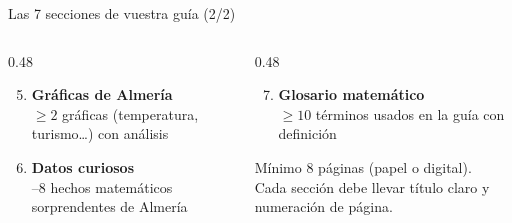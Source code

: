 \documentclass[aspectratio=169, 10pt, spanish]{beamer}
\begin{document}
\begin{frame}{Las 7 secciones de vuestra guía (2/2)}
  \begin{columns}[T]
    \begin{column}{0.48\textwidth}
      \begin{enumerate}
        \setcounter{enumi}{4}
        \item[\faChartLine] \textbf{Gráficas de Almería}\\
          {\AlmFontFootnote $\geq 2$ gráficas (temperatura, turismo\ldots) con análisis}
        \vspace{4pt}
        \item[\faLightbulb] \textbf{Datos curiosos}\\
          {--8 hechos matemáticos sorprendentes de Almería}
      \end{enumerate}
    \end{column}
    \begin{column}{0.48\textwidth}
      \begin{enumerate}
        \setcounter{enumi}{6}
        \item[\faBook] \textbf{Glosario matemático}\\
          {\AlmFontFootnote $\geq 10$ términos usados en la guía con definición}
      \end{enumerate}
      \vspace{8pt}
      \begin{notabox}
        \AlmFontFootnote
        Mínimo 8 páginas (papel o digital).\\
        Cada sección debe llevar título claro
        y numeración de página.
      \end{notabox}
    \end{column}
  \end{columns}
\end{frame}

\end{document}
